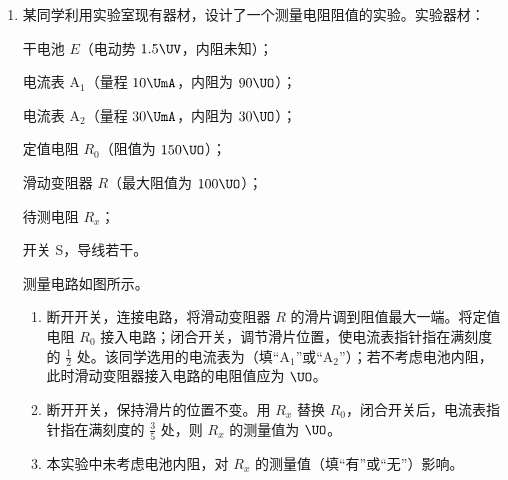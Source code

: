 \documentclass[\gkver]{gaokaozhenti}
\begin{document}
\begin{enumerate}
{根据胡克定律

$k = \frac{F}{\Delta x}$

计算出

$k \approx 12 \UNm$

（2）根据牛顿第二定律有

$F = ma$

则 $a-F$ 图像的斜率为滑块与加速度传感器的总质量的倒数，根据图丙中 Ⅰ，则有

$\frac{1}{m} = \frac{3 - 0}{0.6} \Ukg^{-1} = 5 \Ukg^{-1}$

则滑块与加速度传感器的总质量为

$m = 0.20 \Ukg$

（3）滑块上增加待测物体，同理，根据图丙中 Ⅱ，则有

$\frac{1}{m'} = \frac{1.5 - 0}{0.5} \Ukg^{-1} = 3 \Ukg^{-1}$

则滑块、待测物体与加速度传感器的总质量为 $m' = 0.33 \Ukg$，则待测物体的质量为 $\Delta m = m' - m = 0.13 \Ukg$。
}

\item
某同学利用实验室现有器材，设计了一个测量电阻阻值的实验。实验器材：

干电池 $E$（电动势 $1.5 \UV$，内阻未知）；

电流表 A$_{1}$（量程 $10 \UmA$，内阻为 $90 \UO$）；

电流表 A$_{2}$（量程 $30 \UmA$，内阻为 $30 \UO$）；

定值电阻 $R_{0}$（阻值为 $150 \UO$）；

滑动变阻器 $R$（最大阻值为 $100 \UO$）；

待测电阻 $R_{x}$；

开关 S，导线若干。

测量电路如图所示。
\begin{enumerate}
	\item
	断开开关，连接电路，将滑动变阻器 $R$ 的滑片调到阻值最大一端。将定值电阻 $R_{0}$ 接入电路；闭合开关，调节滑片位置，使电流表指针指在满刻度的 $\frac{1}{2}$ 处。该同学选用的电流表为（填“A$_{1}$”或“A$_{2}$”）；若不考虑电池内阻，此时滑动变阻器接入电路的电阻值应为 $\UO$。
	\item
	断开开关，保持滑片的位置不变。用 $R_{x}$ 替换 $R_{0}$，闭合开关后，电流表指针指在满刻度的 $\frac{3}{5}$ 处，则 $R_{x}$ 的测量值为 $\UO$。
	\item
	本实验中未考虑电池内阻，对 $R_{x}$ 的测量值（填“有”或“无”）影响。
\end{enumerate}


\end{enumerate}
\end{document}
